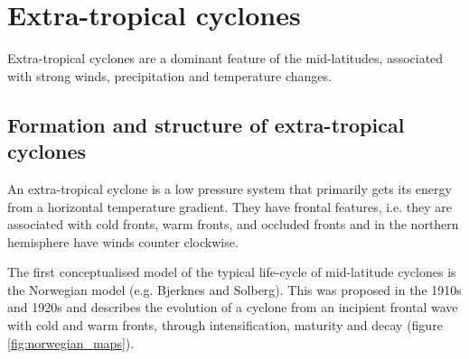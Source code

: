 
\section{Extra-tropical cyclones} \label{ETC}

Extra-tropical cyclones are a dominant feature of the mid-latitudes, associated with strong winds, precipitation and temperature changes.


\subsection {Formation and structure of extra-tropical cyclones}\label{ETC_form}
%

An extra-tropical cyclone is a low pressure system that primarily gets its energy from a horizontal temperature gradient. They have frontal features, i.e. they are associated with cold fronts, warm fronts, and occluded fronts and in the northern hemisphere have winds counter clockwise. 
 
The first conceptualised model of the typical life-cycle of mid-latitude cyclones is the Norwegian model (e.g. Bjerknes and Solberg). This was proposed in the 1910s and 1920s and describes the evolution of a cyclone from an incipient frontal wave with cold and warm fronts, through intensification, maturity and decay (figure \ref {fig:norwegian_maps}).


